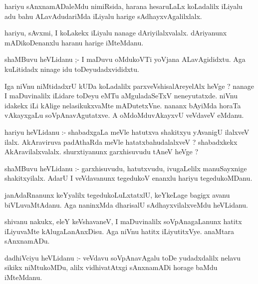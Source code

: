 \documentclass{article}
\begin{document}
\begin{mn}
hariyu  sAnxnamADaleMdu  nimiRsida,  harana  hesaruLaLx  koLadalilx  iLiyalu  adu  bahu  ALavAdudariMda  
iLiyalu  harige  sAdhayxvAgalilxlalx.
\end{mn}

\begin{mn}
hariyu,  sAvxmi,  I  koLakekx  iLiyalu  nanage  dAriyilalxvalalx.  dAriyanunx  mADikoDenanxlu  haranu  harige  iMteMdanu.
\end{mn}

\begin{mn}
shaMBuvu  heVLidanu ;- I  maDuvu  oMdukoVTi  yoVjana  ALavAgididxtu.  Aga  kuLitidadx  ninage  idu  toDeyudadxvididxtu.
\end{mn}

\begin{mn}
Iga  niVnu  niMtidadxrU  kUDa  koLadalilx  parxveVshisalAreyelAlx  heVge ?  nanage  I  maDuvinalilx  iLidare  
toDeyu  eMTu  aMguladaSeTxV  neneyutatxde.  niVnu  idakekx  iLi  kAlige  nelasikukxvaMte  mADutetxVne.  nananx 
bAyiMda  horaTa  vAkayxgaLu  soVpAnavAgutatxve.  A  oMdoMduvAkayxvU  veVdaveV  eMdanu.
\end{mn}

\begin{mn}
hariyu  heVLidanu :- shabadxgaLa  meVle  hatutxva  shakitxyu  yAvanigU  ilalxveV ilalx.  AkAraviruva  padAthaRda  
meVle  hatatxbahudalalxveV ?  shabadxkekx  AkAravilalxvalalx.  shurxtiyanunx  garxhisuvudu  tAneV  heVge ?
\end{mn}

\begin{mn}
shaMBuvu  heVLidanu :- garxhisuvudu,  hatutxvudu,  ivugaLelilx  manuSayxnige  shakitxyilalx.  AdarU  I  veVdavanunx  
tegedukoV  enanxlu  hariyu  tegedukoMDanu.
\end{mn}

\begin{mn}
janAdaRnanunx  keYyalilx  tegedukoLuLxtatxlU,  keYkeLage  bagigx  avanu  biVLuvaMtAdanu.  Aga  naninxMda  dharisalU  
sAdhayxvilalxveMdu  heVLidanu.
\end{mn}

\begin{mn}
shivanu  nakukx,  eleY  keVshavaneV,  I  maDuvinalilx  soVpAnagaLanunx  hatitx  iLiyuvaMte  kAlugaLanAnxDisu.  
Aga  niVnu  hatitx  iLiyutitxVye.  anaMtara  sAnxnamADu.
\end{mn}

\begin{mn}
dadhiVciyu  heVLidanu :- veVdavu  soVpAnavAgalu  toDe yudadxdalilx  nelavu  sikikx  niMtukoMDu,  alilx  vidhivatAtxgi  
sAnxnamADi  horage  baMdu  iMteMdanu.
\end{mn}
\end{document}
